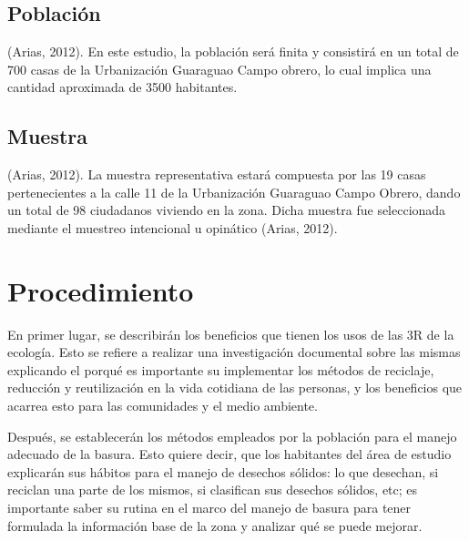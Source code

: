 \subsection{Población}

 (Arias, 2012). En este estudio, la población será finita y consistirá en un total de 700 casas de la Urbanización Guaraguao Campo obrero, lo cual implica una cantidad aproximada de 3500 habitantes.

\subsection{Muestra}

 (Arias, 2012). La muestra representativa estará compuesta por las 19 casas pertenecientes a la calle 11 de la Urbanización Guaraguao Campo Obrero, dando un total de 98 ciudadanos viviendo en la zona. Dicha muestra fue seleccionada mediante el muestreo intencional u opinático  (Arias, 2012).

\section{Procedimiento}

En primer lugar, se describirán los beneficios que tienen los usos de las 3R de la ecología. Esto se refiere a realizar una investigación documental sobre las mismas explicando el porqué es importante su implementar los métodos de reciclaje, reducción y reutilización en la vida cotidiana de las personas, y los beneficios que acarrea esto para las comunidades y el medio ambiente.

Después, se establecerán los métodos empleados por la población para el manejo adecuado de la basura. Esto quiere decir, que los habitantes del área de estudio explicarán sus hábitos para el manejo de desechos sólidos: lo que desechan, si reciclan una parte de los mismos, si clasifican sus desechos sólidos, etc; es importante saber su rutina en el marco del manejo de basura para tener formulada la información base de la zona y analizar qué se puede mejorar.

